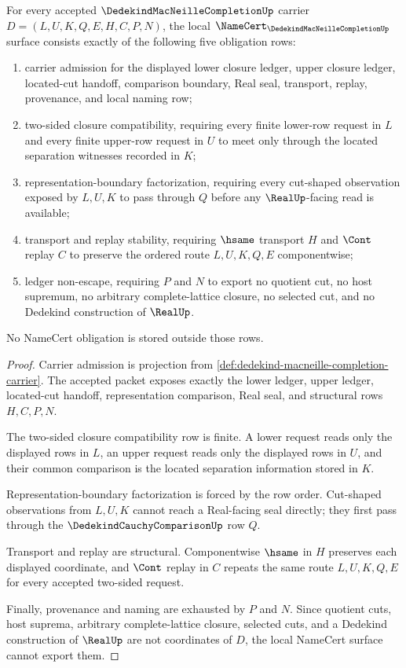 \begin{theorem}
\label{thm:dedekind-macneille-completion-namecert-obligations}
For every accepted $\DedekindMacNeilleCompletionUp$ carrier $D=(L,U,K,Q,E,H,C,P,N)$, the local $\NameCert_{\DedekindMacNeilleCompletionUp}$ surface consists exactly of the following five obligation rows:
\begin{enumerate}
\item carrier admission for the displayed lower closure ledger, upper closure ledger, located-cut handoff, comparison boundary, Real seal, transport, replay, provenance, and local naming row;
\item two-sided closure compatibility, requiring every finite lower-row request in $L$ and every finite upper-row request in $U$ to meet only through the located separation witnesses recorded in $K$;
\item representation-boundary factorization, requiring every cut-shaped observation exposed by $L,U,K$ to pass through $Q$ before any $\RealUp$-facing read is available;
\item transport and replay stability, requiring $\hsame$ transport $H$ and $\Cont$ replay $C$ to preserve the ordered route $L,U,K,Q,E$ componentwise;
\item ledger non-escape, requiring $P$ and $N$ to export no quotient cut, no host supremum, no arbitrary complete-lattice closure, no selected cut, and no Dedekind construction of $\RealUp$.
\end{enumerate}
No NameCert obligation is stored outside those rows.
\end{theorem}
\begin{proof}
Carrier admission is projection from \autoref{def:dedekind-macneille-completion-carrier}. The accepted packet exposes exactly the lower ledger, upper ledger, located-cut handoff, representation comparison, Real seal, and structural rows $H,C,P,N$.

The two-sided closure compatibility row is finite. A lower request reads only the displayed rows in $L$, an upper request reads only the displayed rows in $U$, and their common comparison is the located separation information stored in $K$.

Representation-boundary factorization is forced by the row order. Cut-shaped observations from $L,U,K$ cannot reach a Real-facing seal directly; they first pass through the $\DedekindCauchyComparisonUp$ row $Q$.

Transport and replay are structural. Componentwise $\hsame$ in $H$ preserves each displayed coordinate, and $\Cont$ replay in $C$ repeats the same route $L,U,K,Q,E$ for every accepted two-sided request.

Finally, provenance and naming are exhausted by $P$ and $N$. Since quotient cuts, host suprema, arbitrary complete-lattice closure, selected cuts, and a Dedekind construction of $\RealUp$ are not coordinates of $D$, the local NameCert surface cannot export them.
\end{proof}

